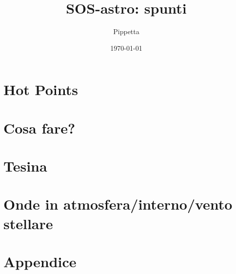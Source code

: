 \documentclass[oneside,12pt,fleqn]{memoir}		%
\author{Pippetta}
\title{SOS-astro: spunti}
\date{\today}
\begin{document}
\maketitle
\tableofcontents*


\part{Hot Points}



\listoffigures

\mainmatter


\part{Cosa fare?}

%

\part{Tesina}


%

%
%



\part{Onde in atmosfera/interno/vento stellare}




\appendix
\part{Appendice}

%

\clearpage
{}
\printindex
\end{document}
